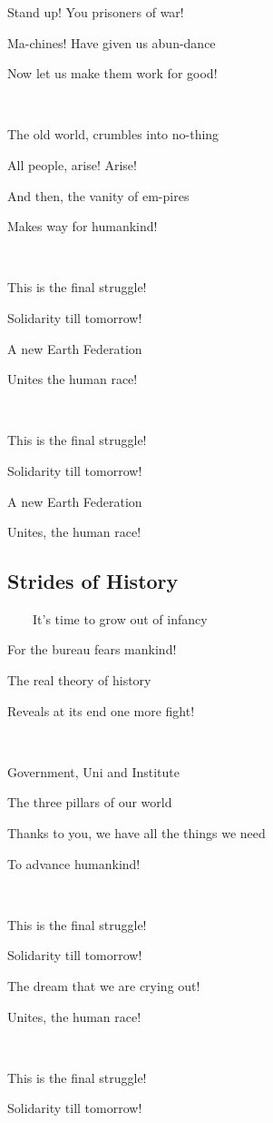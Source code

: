 \documentclass[11pt]{article}
\begin{document}
	Stand up! You prisoners of war!
	
	Ma-chines! Have given us abun-dance
	
	Now let us make them work for good!
	
	\ 
	
	The old world, crumbles into no-thing
	
	All people, arise! Arise!

	And then, the vanity of em-pires

	Makes way for humankind!	
	
	\ 
	
	This is the final struggle! 
	
	Solidarity till tomorrow!
	
	A new Earth Federation
	
	Unites the human race!
	
	\ 
	
	This is the final struggle!
	
	Solidarity till tomorrow!
	
	A new Earth Federation
	
	Unites, the human race!
	\newpage
	
	\subsection{Strides of History}
	
	\ \ \ \ It's time to grow out of infancy
	
	For the bureau fears mankind!

	The real theory of history

	Reveals at its end one more fight!	
	
	\ 
	
	Government, Uni and Institute
	
	The three pillars of our world
	
	Thanks to you, we have all the things we need
	
	To advance humankind!
	
	\ 
	
	This is the final struggle!
	
	Solidarity till tomorrow!
	
	The dream that we are crying out!
	
	Unites, the human race! 
	
	\ 
	
	This is the final struggle!
	
	Solidarity till tomorrow!
	
\end{document}
